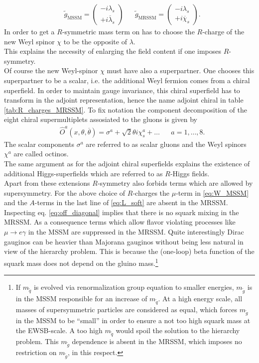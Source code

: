 \begin{align}
& \tilde{g}_\mathrm{MSSM} = \begin{pmatrix}
-i \lambda_s \\
+i \overline{\lambda}_s
\end{pmatrix} && \tilde{g}_\mathrm{MRSSM} = \begin{pmatrix}
-i \lambda_s \\
+i \overline{\chi}_s
\end{pmatrix}.
\end{align}
In order to get a $R$-symmetric mass term on has to choose the $R$-charge of the new Weyl spinor $\chi$ to be the opposite of $\lambda$.\\
This explains the necessity of enlarging the field content if one imposes $R$-symmetry.\\
Of course the new Weyl-spinor $\chi$ must have also a superpartner. One chooses this superpartner to be a scalar, i.e. the additional Weyl fermion comes from a chiral superfield. In order to maintain gauge invariance, this chiral superfield has to transform in the adjoint representation, hence the name adjoint chiral in table \ref{tab:R_charges_MRSSM}. To fix notation the component decomposition of the eight chiral supermultiplets assosiated to the gluons is given by
\begin{align}
&\hat{O}^a(x, \theta, \overline{\theta}) = \sigma^a + \sqrt{2}\theta i\chi^a_s + \hdots && a = 1,\hdots,8.
\end{align}
The scalar components $\sigma^a$ are referred to as scalar gluons and the Weyl spinors $\chi^a$ are called octinos.\\
The same argument as for the adjoint chiral superfields explains the existence of additional Higgs-superfields which are referred to as $R$-Higgs fields.\\
Apart from these extensions $R$-symmetry also forbids terms which are allowed by supersymmetry. For the above choice of $R$-charges the $\mu$-term in \eqref{eq:W_MSSM} and the $A$-terms in the last line of \eqref{eq:L_soft} are absent in the MRSSM. Inspecting eq. \eqref{eq:off_diagonal} implies that there is no squark mixing in the MRSSM. As a consequence terms which allow flavor violating processes like $\mu \to e \gamma$ in the MSSM are suppressed in the MRSSM\cite{Kribs:2007ac}. Quite interestingly Dirac gauginos can be heavier than Majorana gauginos without being less natural in view of the hierarchy problem\cite{Fox:2002bu, Nelson:2002ca, Kribs:2012gx, Hardy:2013ywa}. This is because the (one-loop) beta function of the squark mass does not depend on the gluino mass.\footnote{If $m_{\tilde{q}}$ is evolved via renormalization group equation to smaller energies, $m_{\tilde{g}}$ is in the MSSM responsible for an increase of $m_{\tilde{q}}$. At a high energy scale, all masses of supersymmetric particles are considered as equal, which forces $m_{\tilde{g}}$ in the MSSM to be ``small'' in order to ensure a not too high squark mass at the EWSB-scale. A too high $m_{\tilde{q}}$ would spoil the solution to the hierarchy problem. This $m_{\tilde{g}}$ dependence is absent in the MRSSM, which imposes no restriction on $m_{\tilde{g}}$, in this respect.}
